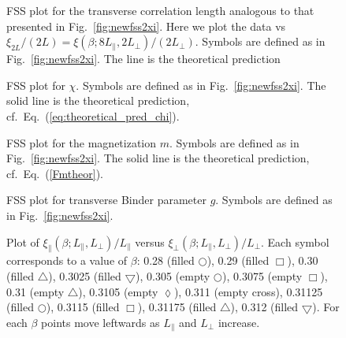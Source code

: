 \documentclass[12pt]{article}
\begin{document}
\begin{figure}
  \centering
\caption{FSS plot for the transverse correlation length 
  analogous to that presented in 
  Fig.~\protect\ref{fig:newfss2xi}. Here we plot the data vs 
  $\xi_{2L}/(2 L) = \xi(\beta;8L_\|,2L_\bot)/(2 L_\bot)$.
  Symbols are defined as in Fig.~\ref{fig:newfss2xi}. The 
  line is the theoretical prediction }
  \label{fig:newfss2xi2}
\end{figure}


\begin{figure}
  \centering
\caption{FSS plot for $\chi$. Symbols are defined as in
  Fig.~\ref{fig:newfss2xi}. The solid
   line is the theoretical prediction, 
   cf.~Eq.~(\ref{eq:theoretical_pred_chi}).}
  \label{fig:newfss2chi2}
\end{figure}

\begin{figure}
  \centering
\caption{FSS plot for the magnetization $m$. Symbols are defined as in 
   Fig.~\ref{fig:newfss2xi}.  The solid
   line is the theoretical prediction, 
   cf.~Eq.~(\ref{Fmtheor}).}
  \label{fig:newfss2mag2}
\end{figure}


\begin{figure}
  \centering
\caption{FSS plot for transverse Binder parameter $g$. Symbols are defined 
   as in Fig.~\ref{fig:newfss2xi}.}
  \label{fig:newfss2binder2}
\end{figure}



\begin{figure}
  \centering
\caption{Plot of $\xi_{\|}(\beta;L_\|,L_\bot)/L_{\|}$ versus 
  $\xi_\bot(\beta;L_\|,L_\bot)/L_\bot$. 
  Each symbol corresponds to a value of $\beta$: 
  0.28 (filled $\bigcirc$), 
  0.29 (filled $\Box$),
  0.30 (filled $\bigtriangleup$), 
  0.3025 (filled $\bigtriangledown$),
  0.305 (empty $\bigcirc$),
  0.3075 (empty $\Box$),
  0.31 (empty $\bigtriangleup$),
  0.3105 (empty $\lozenge$),
  0.311 (empty cross),
  0.31125 (filled $\bigcirc$), 
  0.3115 (filled $\Box$),
  0.31175 (filled $\bigtriangleup$),
  0.312 (filled $\bigtriangledown$).
  For each $\beta$ points move leftwards as 
  $L_\|$ and $L_\bot$ increase.}
  \label{fig:fssdelta}
\end{figure}
\end{document}

